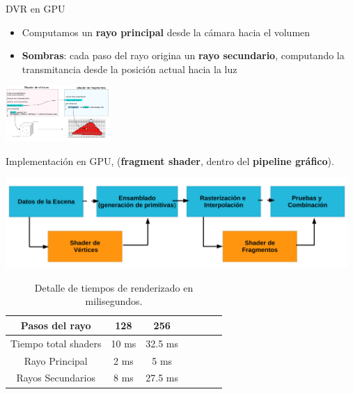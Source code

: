 \documentclass[spanish,unknownkeysallowed]{beamer}
\begin{document}


\begin{frame}{DVR en GPU}

\begin{itemize}
\item Computamos un \textbf{rayo principal} desde la cámara hacia el volumen
\item \textbf{Sombras}: cada paso del rayo origina un \textbf{rayo secundario}, computando la transmitancia desde la posición actual hacia la luz
\end{itemize}

\centerline{\includegraphics[width=4cm]{../figures/fragmentshader}}

\end{frame}

\begin{frame}
Implementación en GPU, (\textbf{fragment shader}, dentro del \textbf{pipeline gráfico}).

\centerline{\includegraphics[width=13cm]{../figures/pipelinegrafico}}

\begin{table}[htb]
\centering

\begin{tabular}{|c|c|c|c|c|c|c|}
\hline
 Pasos del rayo         & 128 &  256 \\
\hline
\hline
 Tiempo total shaders   & 10 ms &  32.5 ms \\
\hline
 Rayo Principal         & 2 ms  & 5 ms  \\
\hline
 Rayos Secundarios      &  8 ms & 27.5 ms  \\
\hline
\end{tabular}
\caption{Detalle de tiempos de renderizado en milisegundos.}
\label{tab:n2}
\end{table}


\end{frame}
\end{document}
